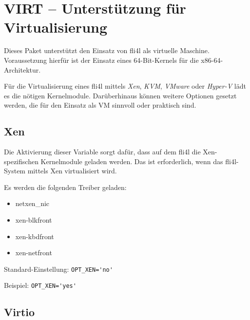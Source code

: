 \section {VIRT -- Unterstützung für Virtualisierung}

Dieses Paket unterstützt den Einsatz von fli4l als virtuelle Maschine.
Voraussetzung hierfür ist der Einsatz eines 64-Bit-Kernels für die
x86-64-Architektur.

Für die Virtualisierung eines fli4l mittels \emph{Xen}, \emph{KVM},
\emph{VMware} oder \emph{Hyper-V} lädt es die nötigen Kernelmodule.
Darüberhinaus können weitere Optionen gesetzt werden, die für den
Einsatz als VM sinnvoll oder praktisch sind.

\subsection {Xen}

\begin{description}

Die Aktivierung dieser Variable sorgt dafür, dass auf dem fli4l die
Xen-spezifischen Kernelmodule geladen werden. Das ist erforderlich, wenn
das fli4l-System mittels Xen virtualisiert wird.

Es werden die folgenden Treiber geladen:

\begin{itemize}
   \item netxen\_nic
   \item xen-blkfront
   \item xen-kbdfront
   \item xen-netfront
\end{itemize}

Standard-Einstellung: \verb+OPT_XEN='no'+

Beispiel: \verb+OPT_XEN='yes'+

\end{description}

\subsection {Virtio}

